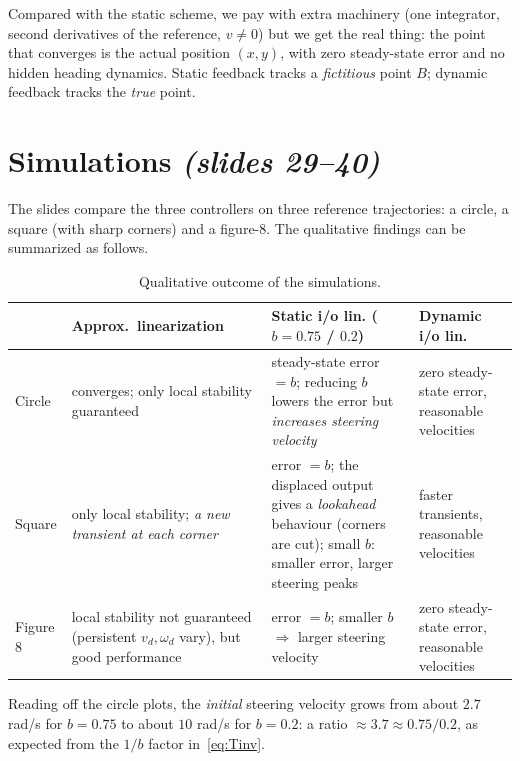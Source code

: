 \documentclass[11pt,a4paper]{article}
\newcommand{\vd}{v_d}
\newcommand{\omd}{\omega_d}
\theoremstyle{definition}
\theoremstyle{plain}
\theoremstyle{remark}
\begin{document}
\begin{intuition}
Compared with the static scheme, we pay with extra machinery (one integrator, second derivatives of the reference, $v\neq0$) but we get the real thing: the point that converges is the actual position $(x,y)$, with zero steady-state error and no hidden heading dynamics. Static feedback tracks a \emph{fictitious} point $B$; dynamic feedback tracks the \emph{true} point.
\end{intuition}

\section{Simulations \texorpdfstring{\emph{(slides 29--40)}}{(slides 29--40)}}

The slides compare the three controllers on three reference trajectories: a circle, a square (with sharp corners) and a figure-8. The qualitative findings can be summarized as follows.

\begin{table}[H]
\centering\small
\begin{tabularx}{\textwidth}{@{}l>{\raggedright\arraybackslash}X>{\raggedright\arraybackslash}X>{\raggedright\arraybackslash}X@{}}
\toprule
 & \textbf{Approx.\ linearization} & \textbf{Static i/o lin.} ($b=0.75$ / $0.2$) & \textbf{Dynamic i/o lin.}\\
\midrule
Circle & converges; only local stability guaranteed & steady-state error $=b$; reducing $b$ lowers the error but \emph{increases steering velocity} & zero steady-state error, reasonable velocities\\
Square & only local stability; \emph{a new transient at each corner} & error $=b$; the displaced output gives a \emph{lookahead} behaviour (corners are cut); small $b$: smaller error, larger steering peaks & faster transients, reasonable velocities\\
Figure 8 & local stability not guaranteed (persistent $\vd,\omd$ vary), but good performance & error $=b$; smaller $b$ $\Rightarrow$ larger steering velocity & zero steady-state error, reasonable velocities\\
\bottomrule
\end{tabularx}
\caption{Qualitative outcome of the simulations.}
\end{table}

Reading off the circle plots, the \emph{initial} steering velocity grows from about $2.7$ rad/s for $b=0.75$ to about $10$ rad/s for $b=0.2$: a ratio $\approx 3.7\approx 0.75/0.2$, as expected from the $1/b$ factor in~\eqref{eq:Tinv}.
\end{document}
